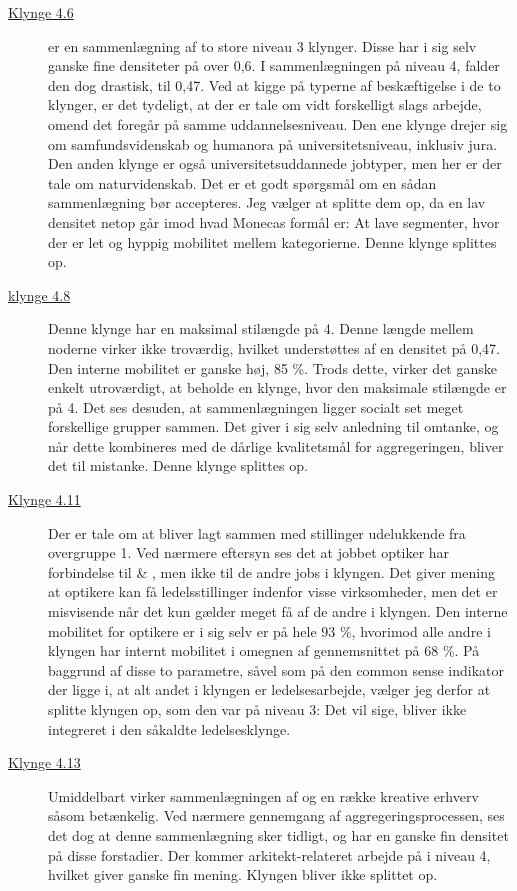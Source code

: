 \begin{description}
    \item[\underline{Klynge 4.6}] er en sammenlægning af to store niveau 3 klynger. Disse har i sig selv ganske fine densiteter på over 0,6. I sammenlægningen på niveau 4, falder den dog drastisk, til 0,47. Ved at kigge på typerne af beskæftigelse i de to klynger, er det tydeligt, at der er tale om vidt forskelligt slags arbejde, omend det foregår på samme uddannelsesniveau. Den ene klynge drejer sig om samfundsvidenskab og humanora på universitetsniveau, inklusiv jura. Den anden klynge er også universitetsuddannede jobtyper, men her er der tale om naturvidenskab. Det er et godt spørgsmål om en sådan sammenlægning bør accepteres. Jeg vælger at splitte dem op, da en lav densitet netop går imod hvad Monecas formål er: At lave segmenter, hvor der er let og hyppig mobilitet mellem kategorierne. Denne klynge splittes op.

    \item[\underline{klynge 4.8}] Denne klynge har en maksimal stilængde på 4. Denne længde mellem noderne virker ikke troværdig, hvilket understøttes af en densitet på 0,47. Den interne mobilitet er ganske høj, 85 \%. Trods dette, virker det ganske enkelt utroværdigt, at beholde en klynge, hvor den maksimale stilængde er på 4. Det ses desuden, at sammenlægningen ligger socialt set meget forskellige grupper sammen. Det giver i sig selv anledning til omtanke, og når dette kombineres med de dårlige kvalitetsmål for aggregeringen, bliver det til mistanke. Denne klynge splittes op. 

    \item[\underline{Klynge 4.11}] Der er tale om at  bliver lagt sammen med stillinger udelukkende fra overgruppe 1. Ved nærmere eftersyn ses det at jobbet optiker har forbindelse til  \& , men ikke til de andre jobs i klyngen. Det giver mening at optikere kan få ledelsstillinger indenfor visse virksomheder, men det er misvisende når det kun gælder meget få af de andre i klyngen. Den interne mobilitet for optikere er i sig selv er på hele 93 \%,  hvorimod alle andre i klyngen har internt mobilitet i omegnen af gennemsnittet på 68 \%. På baggrund af disse to parametre, såvel som på den common sense indikator der ligge i, at alt andet i klyngen er ledelsesarbejde,  vælger jeg derfor at splitte klyngen op, som den var på niveau 3: Det vil sige,  bliver ikke integreret i den såkaldte ledelsesklynge. 

    \item[\underline{Klynge 4.13}] Umiddelbart virker sammenlægningen af  og en række kreative erhverv såsom  betænkelig. Ved nærmere gennemgang af aggregeringsprocessen, ses det dog at denne sammenlægning sker tidligt, og har en ganske fin densitet på disse forstadier. Der kommer arkitekt-relateret arbejde på i niveau 4, hvilket giver ganske fin mening. Klyngen bliver ikke splittet op. 


\end{description}
